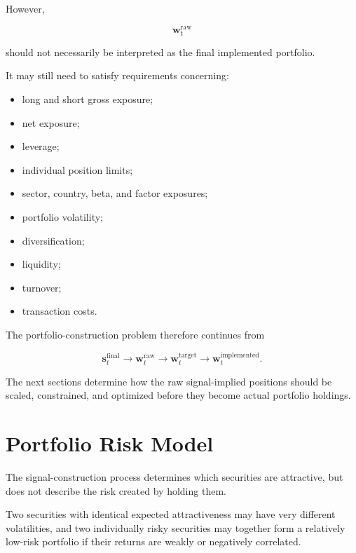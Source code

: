 \documentclass[11pt,a4paper]{article}
\begin{document}
However,

\begin{equation}
\mathbf{w}_t^{\mathrm{raw}}
\end{equation}

should not necessarily be interpreted as the final implemented portfolio.

It may still need to satisfy requirements concerning:

\begin{itemize}
    \item long and short gross exposure;
    \item net exposure;
    \item leverage;
    \item individual position limits;
    \item sector, country, beta, and factor exposures;
    \item portfolio volatility;
    \item diversification;
    \item liquidity;
    \item turnover;
    \item transaction costs.
\end{itemize}

The portfolio-construction problem therefore continues from

\begin{equation}
\boxed{
\mathbf{s}_t^{\mathrm{final}}
\rightarrow
\mathbf{w}_t^{\mathrm{raw}}
\rightarrow
\mathbf{w}_t^{\mathrm{target}}
\rightarrow
\mathbf{w}_t^{\mathrm{implemented}}.
}
\end{equation}

The next sections determine how the raw signal-implied positions should be
scaled, constrained, and optimized before they become actual portfolio
holdings.


\section{Portfolio Risk Model}
\label{sec:portfolio_risk_model}

The signal-construction process determines which securities are attractive, but
does not describe the risk created by holding them.

Two securities with identical expected attractiveness may have very different
volatilities, and two individually risky securities may together form a
relatively low-risk portfolio if their returns are weakly or negatively
correlated.
\end{document}
